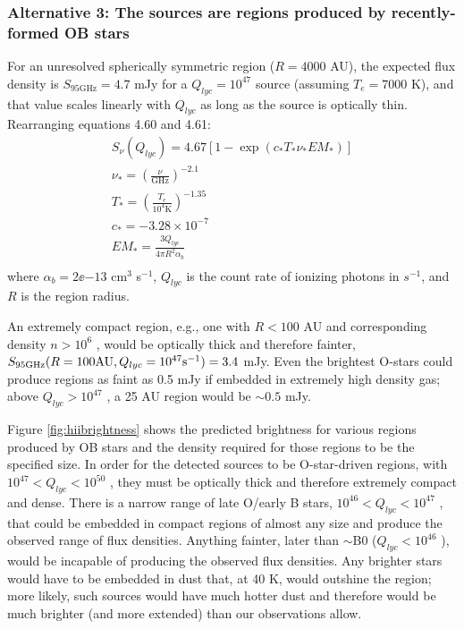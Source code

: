 \documentclass[twocolumn]{aastex61}
\begin{document}
\subsubsection{Alternative 3: The sources are \hii regions produced by
recently-formed OB stars}
\label{sec:theyarehiiregions}

For an unresolved spherically symmetric \hii region ($R=4000$ AU), the expected
flux density is $S_{95 \mathrm{GHz}} = 4.7$ mJy for a $Q_{lyc}=10^{47}$ \pers
source (assuming $T_e=7000$ K), and that value scales linearly with $Q_{lyc}$
as long as the source is optically thin.  Rearranging \citet{Condon2007a} equations
4.60 and 4.61:
\begin{eqnarray}
S_{\nu}(Q_{lyc})  = 4.67 \left[1-\exp\left(c_* T_* \nu_* EM_* \right) \right] \nonumber \\
\nu_* = \left(\frac{\nu}{\mathrm{GHz}}\right)^{-2.1} \nonumber \\
T_* = \left(\frac{T_e}{10^4 \mathrm{K}}\right)^{-1.35} \nonumber \\
c_* = -3.28\times10^{-7} \nonumber \\
EM_* = \frac{3 Q_{lyc}}{4 \pi R^2 \alpha_b} \nonumber \\
\end{eqnarray}
where $\alpha_b=2\ee{-13}$ cm$^3$ s$^{-1}$, $Q_{lyc}$ is the count rate
of ionizing photons in $s^{-1}$, and $R$ is the \hii region radius.

An extremely compact \hii region,
e.g., one with $R<100$ AU and corresponding density $n>10^6$ \percc, would be
optically thick and therefore fainter, $S_{95 \mathrm{GHz}}(R=100 \mathrm{AU},
Q_{lyc}=10^{47} \mathrm{s}^{-1})=3.4$ mJy.  Even the brightest O-stars could produce \hii
regions as faint as 0.5 mJy if embedded in extremely high density gas; above
$Q_{lyc}>10^{47}$ \pers, a 25 AU \hii region would be $\sim0.5$ mJy.

Figure \ref{fig:hiibrightness} shows the predicted brightness for various \hii
regions produced by OB stars and the density required for those \hii regions
to be the specified size.  In
order for the detected sources to be O-star-driven \hii regions, with $10^{47}
< Q_{lyc} < 10^{50}$ \pers, they must be optically thick and therefore
extremely compact and dense.  There is a narrow range of late O/early B stars,
$10^{46} < Q_{lyc} < 10^{47}$ \pers, that could be embedded in compact \hii
regions of almost any size and produce the observed range of flux densities.
Anything fainter, later than $\sim$B0 ($Q_{lyc}<10^{46}$ \pers), would be
incapable of producing the observed flux densities.
Any brighter stars would have to be embedded in dust that, at 40 K, would
outshine the \hii region; more likely, such sources would have much hotter dust
and therefore would be much brighter (and more extended) than our observations
allow.
\end{document}
